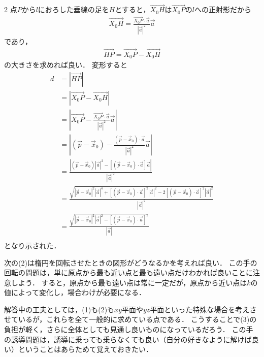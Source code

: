 \documentclass[../../main.tex]{subfiles}
\begin{document}
\begin{multicols}{2}
  点$P$から$l$におろした垂線の足を$H$とすると，$\vec{X_0H}$は$\vec{X_0P}$の$l$への正射影だから
  \begin{align*}
    \vec{X_0H} = \frac{\vec{X_0P}\cdot \vec{a}}{|\vec{a}|^2}\vec{a}
  \end{align*}
  であり，
  \begin{align*}
    \vec{HP} = \vec{X_0P} -\vec{X_0H}
  \end{align*}
  の大きさを求めれば良い．
  変形すると
  \begin{align*}
    d
     & = \left|\vec{HP}\right|                                                                                                                                                                         \\
     & = \left|\vec{X_0P}-\vec{X_0H}\right|                                                                                                                                                            \\
     & = \left|\vec{X_0P}-\frac{\vec{X_0P}\cdot \vec{a}}{|\vec{a}|^2}\vec{a}\right|                                                                                                                    \\
     & = \left|\left(\vec{p}-\vec{x}_0\right)-\frac{(\vec{p}-\vec{x}_0)\cdot \vec{a}}{|\vec{a}|^2}\vec{a}\right|                                                                                       \\
     & = \frac{\left|\left(\vec{p}-\vec{x}_0\right)|\vec{a}|^2-\left[(\vec{p}-\vec{x}_0)\cdot \vec{a}\right]\vec{a}\right|}{|\vec{a}|^2}                                                               \\
     & = \frac{\sqrt{\left|\vec{p}-\vec{x}_0\right|^2|\vec{a}|^4+\left[(\vec{p}-\vec{x}_0)\cdot \vec{a}\right]^2|\vec{a}|^2-2\left[(\vec{p}-\vec{x}_0)\cdot \vec{a}\right]^2|\vec{a}|^2}}{|\vec{a}|^2} \\
     & = \frac{\sqrt{\left|\vec{p}-\vec{x}_0\right|^2|\vec{a}|^2-\left[(\vec{p}-\vec{x}_0)\cdot \vec{a}\right]^2}}{|\vec{a}|}                                                                          \\
  \end{align*}
  となり示された．

  次の(2)は楕円を回転させたときの図形がどうなるかを考えれば良い．
  この手の回転の問題は，単に原点から最も近い点と最も遠い点だけわかれば良いことに注意しよう．
  すると，原点から最も遠い点は常に一定だが，原点から近い点は$k$の値によって変化し，場合わけが必要になる．


  解答中の工夫としては，(1)も(2)も$xy$平面や$yz$平面といった特殊な場合を考えさせているが，これらを全て一般的に求めている点である．
  こうすることで(3)の負担が軽く，さらに全体としても見通し良いものになっているだろう．
  この手の誘導問題は，誘導に乗っても乗らなくても良い（自分の好きなように解けば良い）ということはあらためて覚えておきたい．


  \newpage
\end{multicols}
\end{document}
